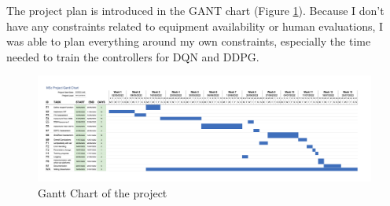 The project plan is introduced in the GANT chart (Figure \ref{gantt}). Because I don't have any constraints related to equipment availability or human evaluations, I was able to plan everything around my own constraints, especially the time needed to train the controllers for DQN and DDPG. \\

\begin{figure}[H]
\centering
\includegraphics[angle=90, scale=0.09]{Figures/gantt.png}
\caption{Gantt Chart of the project}
\label{gantt}
\end{figure}
